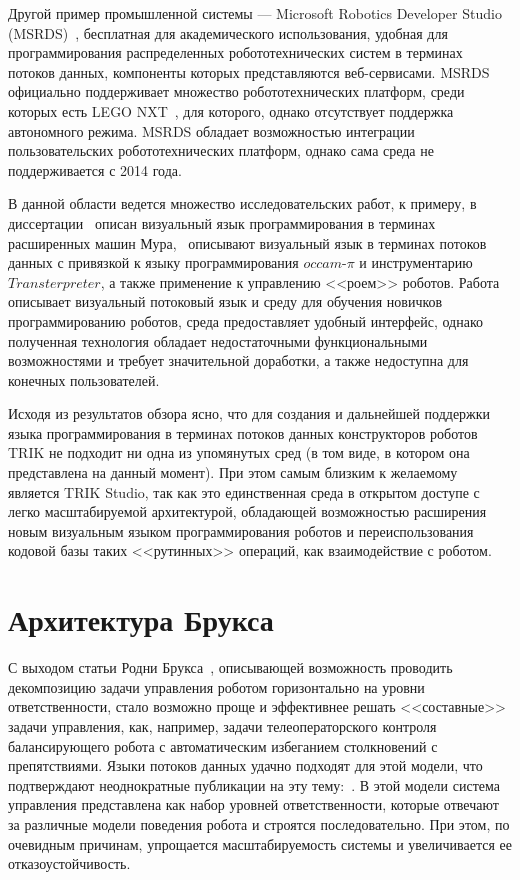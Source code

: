 \documentclass[conference]{IEEEtran}
\begin{document}
Другой пример промышленной системы --- Microsoft Robotics Developer Studio (MSRDS)~\cite{jackson2007microsoft}, бесплатная для академического использования, удобная для программирования распределенных робототехнических систем в терминах потоков данных, компоненты которых представляются веб-сервисами. MSRDS официально поддерживает множество робототехнических платформ, среди которых есть LEGO NXT~\cite{kim2007programming}, для которого, однако отсутствует поддержка автономного режима. MSRDS обладает возможностью интеграции пользовательских робототехнических платформ, однако сама среда не поддерживается с 2014 года.
 
В данной области ведется множество исследовательских работ, к примеру, в диссертации~\cite{banyasad2000visual} описан визуальный язык программирования в терминах расширенных машин Мура,~\cite{simpson2008visual, posso2011process} описывают визуальный язык в терминах потоков данных с привязкой к языку программирования $occam\mbox{-}\pi$ и инструментарию $Transterpreter$, а также применение к управлению <<роем>> роботов. Работа~\cite{diprose2011ruru} описывает визуальный потоковый язык и среду для обучения новичков программированию роботов, среда предоставляет удобный интерфейс, однако полученная технология обладает недостаточными функциональными возможностями и требует значительной доработки, а также недоступна для конечных пользователей.

Исходя из результатов обзора ясно, что для создания и дальнейшей поддержки языка программирования в терминах потоков данных конструкторов роботов TRIK не подходит ни одна из упомянутых сред (в том виде, в котором она представлена на данный момент). При этом самым близким к желаемому является TRIK Studio, так как это единственная среда в открытом доступе с легко масштабируемой архитектурой, обладающей возможностью расширения новым визуальным языком программирования роботов и переиспользования кодовой базы таких <<рутинных>> операций, как взаимодействие с роботом.


\section{Архитектура Брукса}
\label{sec:Brooks}
С выходом статьи Родни Брукса~\cite{1_brooks_1986}, описывающей возможность проводить декомпозицию задачи управления роботом горизонтально на уровни ответственности, стало возможно проще и эффективнее решать <<составные>> задачи управления, как, например, задачи телеоператорского контроля балансирующего робота с автоматическим избеганием столкновений с препятствиями. Языки потоков данных удачно подходят для этой модели, что подтверждают неоднократные публикации на эту тему:~\cite{simpson2006mobile, banyasad2000visual,posso2011process,proetzsch2007behaviour}. В этой модели система управления представлена как набор уровней ответственности, которые отвечают за различные модели поведения робота и строятся последовательно. При этом, по очевидным причинам, упрощается масштабируемость системы и увеличивается ее отказоустойчивость.
\end{document}

